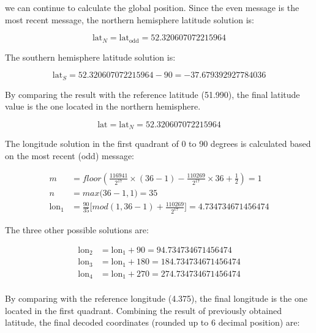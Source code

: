 we can continue to calculate the global position. Since the even message is the most recent message, the northern hemisphere latitude solution is:

\begin{equation}
  \mathrm{lat}_N = \mathrm{lat}_\mathrm{odd} = 52.320607072215964
\end{equation}


The southern hemisphere latitude solution is:

\begin{equation}
    \mathrm{lat}_S = 52.320607072215964 - 90 = -37.679392927784036
\end{equation}
  
By comparing the result with the reference latitude (51.990), the final latitude value is the one located in the northern hemisphere.

\begin{equation}
    \mathrm{lat} = \mathrm{lat}_N = 52.320607072215964
\end{equation}
  

The longitude solution in the first quadrant of 0 to 90 degrees is calculated based on the most recent (odd) message:

\begin{align}
  m &= floor \left( \frac{116941}{2^{17}} \times (36-1) - \frac{110269}{2^{17}} \times 36 + \frac{1}{2}  \right) = 1\\
  n &= max \Big( 36-1, 1 \Big) = 35\\
    \mathrm{lon}_1 &= \frac{90}{35} \Big[ mod(1, 36-1) + \frac{110269}{2^{17}} \Big] = 4.734734671456474
\end{align}

The three other possible solutions are:

\begin{equation}
\begin{split}
    \mathrm{lon}_2 &= \mathrm{lon}_1 + 90 = 94.734734671456474 \\
    \mathrm{lon}_3 &= \mathrm{lon}_1 + 180 = 184.734734671456474 \\
    \mathrm{lon}_4 &= \mathrm{lon}_1 + 270 = 274.734734671456474 \\
\end{split}
\end{equation}

By comparing with the reference longitude (4.375), the final longitude is the one located in the first quadrant. Combining the result of previously obtained latitude, the final decoded coordinates (rounded up to 6 decimal position) are:


